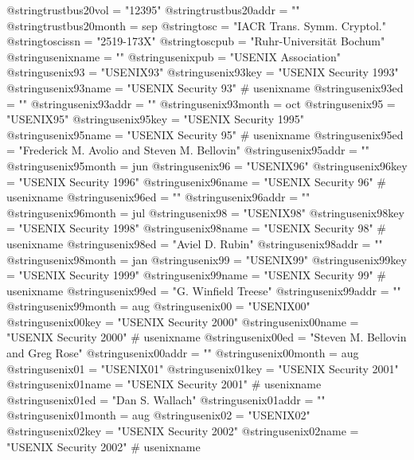 @string{trustbus20vol =         "12395"}
@string{trustbus20addr =        ""}
@string{trustbus20month =       sep}
@string{tosc =                  "{IACR} Trans. Symm. Cryptol."}
@string{toscissn =              "2519-173X"}
@string{toscpub =               "Ruhr-Universit{\"a}t Bochum"}
@string{usenixname =            ""}
@string{usenixpub =             "{USENIX} Association"}
@string{usenix93 =              "USENIX93"}
@string{usenix93key =           "USENIX Security 1993"}
@string{usenix93name =          "USENIX Security 93" # usenixname}
@string{usenix93ed =            ""}
@string{usenix93addr =          ""}
@string{usenix93month =         oct}
@string{usenix95 =              "USENIX95"}
@string{usenix95key =           "USENIX Security 1995"}
@string{usenix95name =          "USENIX Security 95" # usenixname}
@string{usenix95ed =            "Frederick M. Avolio and Steven M. Bellovin"}
@string{usenix95addr =          ""}
@string{usenix95month =         jun}
@string{usenix96 =              "USENIX96"}
@string{usenix96key =           "USENIX Security 1996"}
@string{usenix96name =          "USENIX Security 96" # usenixname}
@string{usenix96ed =            ""}
@string{usenix96addr =          ""}
@string{usenix96month =         jul}
@string{usenix98 =              "USENIX98"}
@string{usenix98key =           "USENIX Security 1998"}
@string{usenix98name =          "USENIX Security 98" # usenixname}
@string{usenix98ed =            "Aviel D. Rubin"}
@string{usenix98addr =          ""}
@string{usenix98month =         jan}
@string{usenix99 =              "USENIX99"}
@string{usenix99key =           "USENIX Security 1999"}
@string{usenix99name =          "USENIX Security 99" # usenixname}
@string{usenix99ed =            "G. Winfield Treese"}
@string{usenix99addr =          ""}
@string{usenix99month =         aug}
@string{usenix00 =              "USENIX00"}
@string{usenix00key =           "USENIX Security 2000"}
@string{usenix00name =          "USENIX Security 2000" # usenixname}
@string{usenix00ed =            "Steven M. Bellovin and Greg Rose"}
@string{usenix00addr =          ""}
@string{usenix00month =         aug}
@string{usenix01 =              "USENIX01"}
@string{usenix01key =           "USENIX Security 2001"}
@string{usenix01name =          "USENIX Security 2001" # usenixname}
@string{usenix01ed =            "Dan S. Wallach"}
@string{usenix01addr =          ""}
@string{usenix01month =         aug}
@string{usenix02 =              "USENIX02"}
@string{usenix02key =           "USENIX Security 2002"}
@string{usenix02name =          "USENIX Security 2002" # usenixname}
